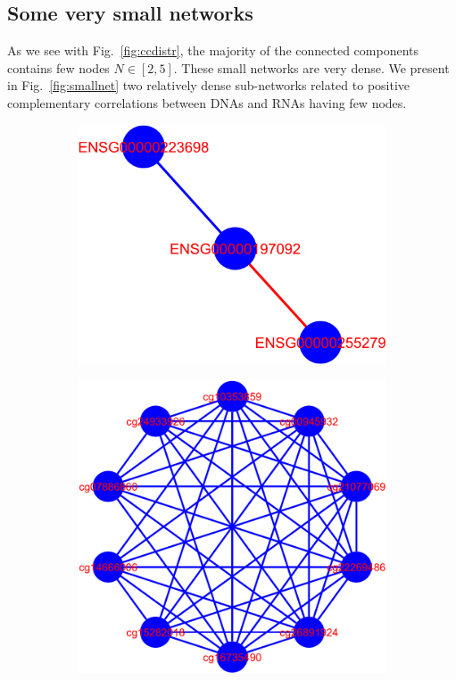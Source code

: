 \documentclass[10pt,a4paper]{article}
\begin{document}
\subsection{Some very small networks}
As we see with Fig.~\ref{fig:ccdistr}, the majority of the connected components contains few nodes $N \in [2,5]$. These small networks are very dense. We present in Fig.~\ref{fig:smallnet} two relatively dense sub-networks related to positive complementary correlations between DNAs and RNAs having few nodes.
\begin{figure}[h!]
\centering
\begin{subfigure}{0.4\textwidth}
\includegraphics[width=\textwidth]{small-RNA-pos-CC-11.pdf}
\end{subfigure}
\hspace{5pt}
\begin{subfigure}{0.4\textwidth}
\includegraphics[width=\textwidth]{small-DNA-pos-CC-31.pdf}

\end{subfigure}
\end{figure}
\end{document}
